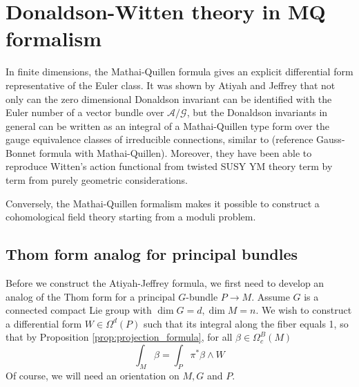 \chapter{Donaldson-Witten theory in MQ formalism}
\label{chapter_aj}
In finite dimensions, the Mathai-Quillen formula gives an explicit differential
form representative of the Euler class. 
It was shown by Atiyah and
Jeffrey \cite{atiyahlagrangians} that not only can the zero dimensional
Donaldson invariant can be identified with the Euler number of a vector bundle
over $\mathcal{A} /\mathcal{G}$, but the Donaldson invariants in general can be
written as an integral of a Mathai-Quillen type form over the gauge equivalence
classes of irreducible connections, similar to (reference Gauss-Bonnet formula
with Mathai-Quillen).
Moreover, they have been able to reproduce Witten's
action functional from twisted SUSY YM theory term by term from purely geometric
considerations.

Conversely,
the Mathai-Quillen formalism makes it possible to construct a cohomological field
theory starting from a moduli problem.

\section{Thom form analog for principal bundles}
Before we construct the Atiyah-Jeffrey formula, we first need to develop an
analog of the Thom form for a principal $G$-bundle $P\to M$. Assume $G$ is
a connected compact Lie group with $\dim G = d, \dim M = n$. 
We wish to construct a differential form  $W\in \Omega^d(P)$
such that its integral along the fiber equals 1, so that by 
Proposition \ref{prop:projection_formula}, for all $\beta\in \Omega_c^B(M)$
\begin{equation} \label{eq:principal_thom_local}
	\int_M \beta = \int_P \pi^*\beta \wedge W
\end{equation}
Of course, we will need an orientation on $M,G$ and $P$.    


